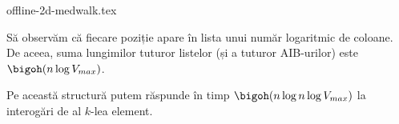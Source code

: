 {offline-2d-medwalk.tex}

Să observăm că fiecare poziție apare în lista unui număr logaritmic de coloane. De aceea, suma lungimilor tuturor listelor (și a tuturor AIB-urilor) este $\bigoh(n \log V_{max})$.

Pe această structură putem răspunde în timp $\bigoh(n \log n \log V_{max})$ la interogări de al $k$-lea element.
